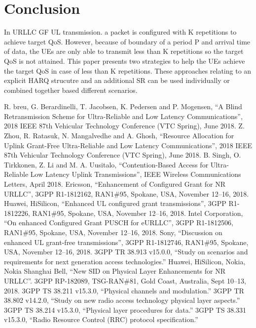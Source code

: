 \documentclass[conference]{IEEEtran}
\begin{document}
\section{Conclusion}\label{IV}

In URLLC GF UL transmission. a packet is configured with K repetitions to achieve target QoS. However, because of boundary of a period P and arrival time of data, the UEs are only able to transmit less than K repetitions so the target QoS is not attained. This paper presents two strategies to help the UEs achieve the target QoS in case of less than K repetitions. These approaches relating to an explicit HARQ strucutre and an additional SR can be used individually or combined together based different scenarios.

\begin{thebibliography}{00}
 R. breu, G. Berardinelli, T. Jacobsen, K. Pedersen and P. Mogensen, ``A Blind Retransmission Scheme for Ultra-Reliable and Low Latency Communications'', 2018 IEEE 87th Vehicular Technology Conference (VTC Spring), June 2018.
 Z. Zhou, R. Ratasuk, N. Mangalvedhe and A. Ghosh, ``Resource Allocation for Uplink Grant-Free Ultra-Reliable and Low Latency Communications'', 2018 IEEE 87th Vehicular Technology Conference (VTC Spring), June 2018.
 B. Singh, O. Tirkkonen, Z. Li and M. A. Uusitalo, ``Contention-Based Access for Ultra-Reliable Low Latency Uplink Transmissions'',  IEEE Wireless Communications Letters, April 2018.
 Ericsson, ``Enhancement of Configured Grant for NR URLLC'', 3GPP R1-1812162, RAN1\#95, Spokane, USA, November 12--16, 2018.
 Huawei, HiSilicon, ``Enhanced UL configured grant transmissions'', 3GPP R1-1812226, RAN1\#95, Spokane, USA, November 12--16, 2018.
 Intel Corporation, ``On enhanced Configured Grant PUSCH for eURLLC'', 3GPP R1-1812506, RAN1\#95, Spokane, USA, November 12--16, 2018.
 Sony, ``Discussion on enhanced UL grant-free transmissions'', 3GPP R1-1812746, RAN1\#95, Spokane, USA, November 12--16, 2018.
 3GPP TR 38.913 v15.0.0, ``Study on scenarios and requirements for next generation access technologies.''
 Huawei, HiSilicon, Nokia, Nokia Shanghai Bell, ``New SID on Physical Layer Enhancements for NR URLLC''. 3GPP RP-182089, TSG-RAN\#81, Gold Coast, Australia, Sept 10--13, 2018.
 3GPP TS 38.211 v15.3.0, ``Physical channels and modulation.''
 3GPP TR 38.802 v14.2.0, ``Study on new radio access technology physical layer aspects.''
 3GPP TS 38.214 v15.3.0, ``Physical layer procedures for data.''
 3GPP TS 38.331 v15.3.0, ``Radio Resource Control (RRC) protocol specification.''

\end{thebibliography}
\vspace{12pt}
\end{document}
